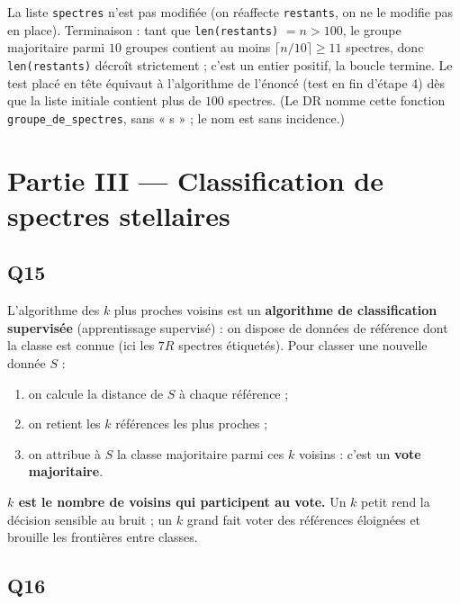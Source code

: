 \documentclass[11pt,a4paper]{article}
\providecommand{\tightlist}{\setlength{\itemsep}{0pt}\setlength{\parskip}{0pt}}
\begin{document}
La liste \texttt{spectres} n'est pas modifiée (on réaffecte \texttt{restants}, on ne le modifie pas en place). Terminaison : tant que \texttt{len(restants)} \(= n > 100\), le groupe majoritaire parmi \(10\) groupes contient au moins \(\lceil n/10 \rceil \geqslant 11\) spectres, donc \texttt{len(restants)} décroît strictement ; c'est un entier positif, la boucle termine. Le test placé en tête équivaut à l'algorithme de l'énoncé (test en fin d'étape 4) dès que la liste initiale contient plus de \(100\) spectres. (Le DR nomme cette fonction \texttt{groupe\_de\_spectres}, sans « s » ; le nom est sans incidence.)

\hypertarget{partie-iii-classification-de-spectres-stellaires}{%
\section{Partie III --- Classification de spectres stellaires}\label{partie-iii-classification-de-spectres-stellaires}}

\hypertarget{q15}{%
\subsection{Q15}\label{q15}}

L'algorithme des \(k\) plus proches voisins est un \textbf{algorithme de classification supervisée} (apprentissage supervisé) : on dispose de données de référence dont la classe est connue (ici les \(7R\) spectres étiquetés). Pour classer une nouvelle donnée \(S\) :

\begin{enumerate}
\def\labelenumi{\arabic{enumi}.}
\tightlist
\item
  on calcule la distance de \(S\) à chaque référence ;
\item
  on retient les \(k\) références les plus proches ;
\item
  on attribue à \(S\) la classe majoritaire parmi ces \(k\) voisins : c'est un \textbf{vote majoritaire}.
\end{enumerate}

\textbf{\(k\) est le nombre de voisins qui participent au vote.} Un \(k\) petit rend la décision sensible au bruit ; un \(k\) grand fait voter des références éloignées et brouille les frontières entre classes.

\hypertarget{q16}{%
\subsection{Q16}\label{q16}}
\end{document}
